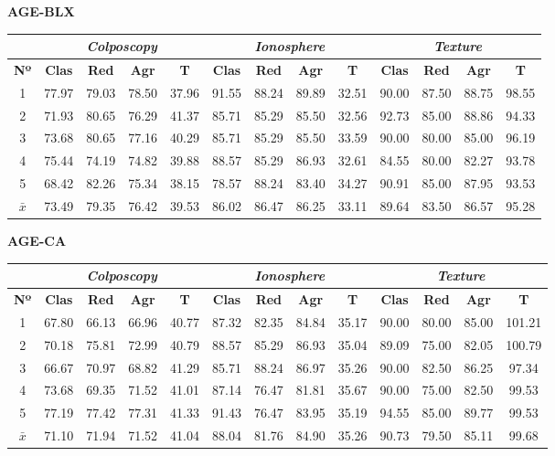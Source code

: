 \documentclass[12pt]{article}
\begin{document}
\textbf{AGE-BLX}

\begin{table}[ht!]
\begin{tabular}{ccccc|cccc|cccc}
 & \multicolumn{4}{c}{\textit{Colposcopy}} & \multicolumn{4}{c}{\textit{Ionosphere}} & \multicolumn{4}{c}{\textit{Texture}} \\ \hline
\textbf{Nº} & \textbf{Clas} & \textbf{Red} & \textbf{Agr} & \textbf{T} & \textbf{Clas} & \textbf{Red} & \textbf{Agr} & \textbf{T} & \textbf{Clas} & \textbf{Red} & \textbf{Agr} & \textbf{T} \\ \hline
1 & 77.97 & 79.03 & 78.50 & 37.96 & 91.55 & 88.24 & 89.89 & 32.51 & 90.00 & 87.50 & 88.75 & 98.55 \\
2 & 71.93 & 80.65 & 76.29 & 41.37 & 85.71 & 85.29 & 85.50 & 32.56 & 92.73 & 85.00 & 88.86 & 94.33 \\
3 & 73.68 & 80.65 & 77.16 & 40.29 & 85.71 & 85.29 & 85.50 & 33.59 & 90.00 & 80.00 & 85.00 & 96.19 \\
4 & 75.44 & 74.19 & 74.82 & 39.88 & 88.57 & 85.29 & 86.93 & 32.61 & 84.55 & 80.00 & 82.27 & 93.78 \\
5 & 68.42 & 82.26 & 75.34 & 38.15 & 78.57 & 88.24 & 83.40 & 34.27 & 90.91 & 85.00 & 87.95 & 93.53 \\
\hline
$\bar{x}$ & 73.49 & 79.35 & 76.42 & 39.53 & 86.02 & 86.47 & 86.25 & 33.11 & 89.64 & 83.50 & 86.57 & 95.28 \\
\end{tabular}
\end{table}

\textbf{AGE-CA}

\begin{table}[ht!]
\begin{tabular}{ccccc|cccc|cccc}
 & \multicolumn{4}{c}{\textit{Colposcopy}} & \multicolumn{4}{c}{\textit{Ionosphere}} & \multicolumn{4}{c}{\textit{Texture}} \\ \hline
\textbf{Nº} & \textbf{Clas} & \textbf{Red} & \textbf{Agr} & \textbf{T} & \textbf{Clas} & \textbf{Red} & \textbf{Agr} & \textbf{T} & \textbf{Clas} & \textbf{Red} & \textbf{Agr} & \textbf{T} \\ \hline
1 & 67.80 & 66.13 & 66.96 & 40.77 & 87.32 & 82.35 & 84.84 & 35.17 & 90.00 & 80.00 & 85.00 & 101.21 \\
2 & 70.18 & 75.81 & 72.99 & 40.79 & 88.57 & 85.29 & 86.93 & 35.04 & 89.09 & 75.00 & 82.05 & 100.79 \\
3 & 66.67 & 70.97 & 68.82 & 41.29 & 85.71 & 88.24 & 86.97 & 35.26 & 90.00 & 82.50 & 86.25 & 97.34 \\
4 & 73.68 & 69.35 & 71.52 & 41.01 & 87.14 & 76.47 & 81.81 & 35.67 & 90.00 & 75.00 & 82.50 & 99.53 \\
5 & 77.19 & 77.42 & 77.31 & 41.33 & 91.43 & 76.47 & 83.95 & 35.19 & 94.55 & 85.00 & 89.77 & 99.53 \\
\hline
$\bar{x}$ & 71.10 & 71.94 & 71.52 & 41.04 & 88.04 & 81.76 & 84.90 & 35.26 & 90.73 & 79.50 & 85.11 & 99.68 \\
\end{tabular}
\end{table}
\end{document}
